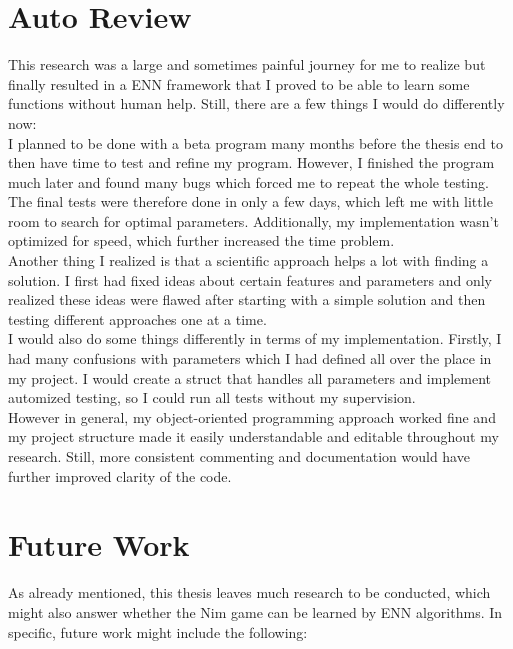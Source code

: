 \section{Auto Review}\label{sec:auto-review}
This research was a large and sometimes painful journey for me to realize but finally resulted in a ENN framework that I proved to be able to learn some functions without human help.
Still, there are a few things I would do differently now:
\\
I planned to be done with a beta program many months before the thesis end to then have time to test and refine my program.
However, I finished the program much later and found many bugs which forced me to repeat the whole testing.
The final tests were therefore done in only a few days, which left me with little room to search for optimal parameters.
Additionally, my implementation wasn't optimized for speed, which further increased the time problem.
\\
Another thing I realized is that a scientific approach helps a lot with finding a solution.
I first had fixed ideas about certain features and parameters and only realized these ideas were flawed after starting with a simple solution and then testing different approaches one at a time.
\\
I would also do some things differently in terms of my implementation.
Firstly, I had many confusions with parameters which I had defined all over the place in my project.
I would create a struct that handles all parameters and implement automized testing, so I could run all tests without my supervision.
\\
However in general, my object-oriented programming approach worked fine and my project structure made it easily understandable and editable throughout my research.
Still, more consistent commenting and documentation would have further improved clarity of the code.


\section{Future Work}\label{sec:future-work}
As already mentioned, this thesis leaves much research to be conducted, which might also answer whether the Nim game can be learned by ENN algorithms.
In specific, future work might include the following:

